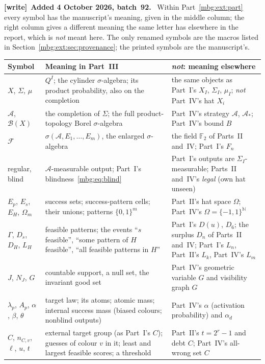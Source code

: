 \documentclass[11pt,letterpaper]{article}
\theoremstyle{definition}
\newcommand{\N}{\mathbb N}
\newcommand{\Sig}{\Sigma}
\newcommand{\F}{\mathbb F}
\newcommand{\Fext}{\mathcal F}
\newcommand{\A}{\mathcal A}
\newcommand{\B}{\mathcal B}
\newcommand{\cyl}{\Sigma}
\newenvironment{writenote}[1][]{\par\smallskip\begingroup\small
 \noindent\textbf{[write]}\if\relax\detokenize{#1}\relax\else~\textbf{#1.}\fi\ }%
 {\par\endgroup\smallskip}
\begin{document}
\begin{writenote}[Added 4 October 2026, batch~92]
Within Part~\ref{mbg:ext:part} every symbol has the manuscript's meaning, given in the middle column; the right column gives a different meaning the same letter has elsewhere in the report, which is \emph{not} meant here. The only renamed symbols are the macros listed in Section~\ref{mbg:ext:sec:provenance}; the printed symbols are the manuscript's.
\begin{longtable}{>{\raggedright\arraybackslash}p{}>{\raggedright\arraybackslash}p{}>{\raggedright\arraybackslash}p{}}
\toprule
Symbol & Meaning in Part~III & \emph{not}: meaning elsewhere\\
\midrule
\endhead
$X$, $\cyl$, $\mu$ & $Q^I$; the cylinder $\sigma$-algebra; its product probability, also on the completion & the same objects as Part~I's $X_I$, $\Sig_I$, $\mu_I$; \emph{not} Part~IV's hat $X_i$\\
$\A$, $\B(X)$ & the completion of $\cyl$; the full product-topology Borel $\sigma$-algebra & Part~IV's strategy $\mathcal A$, $\mathcal A_*$; Part~IV's bound $B$\\
$\Fext$ & $\sigma(\A,E_1,\ldots,E_m)$, the enlarged $\sigma$-algebra & the field $\F_2$ of Parts~II and~IV; Part~I's $F_n$\\
regular, blind & $\A$-measurable output; Part~I's blindness~\eqref{mbg:eq:blind} & Part~I's outputs are $\Sig_I$-measurable; Parts~II and~IV's \emph{legal} (own hat unseen)\\
$E_p$, $E_s$, $E_H$, $\Omega_m$ & success sets; success-pattern cells; their unions; patterns $\{0,1\}^m$ & Part~II's hat space $\Omega$; Part~IV's $\Omega=\{-1,1\}^\N$\\
$\Gamma$, $D_s$, $D_H$, $L_H$ & feasible patterns; the events ``$s$ feasible'', ``some pattern of $H$ feasible'', ``all feasible patterns in $H$'' & Part~I's $D(u)$, $D_6$; the surplus $D_n$ of Parts~II and~IV; Part~I's $L_n$, Part~II's $L_k$, Part~IV's $L_m$\\
$J$, $N_J$, $G$ & countable support, a null set, the invariant good set & Part~IV's geometric variable $G$ and visibility graph $G$\\
$\lambda_p$, $A_p$, $\alpha$, $\beta$, $\theta$ & target law; its atoms; atomic mass; internal success mass (biased colours; nonblind outputs) & Part~IV's $\alpha$ (activation probability) and $\alpha_d$\\
$C$, $n_{C,v}$, $\ell$, $u$, $t$ & external target group (as Part~I's $C$); guesses of colour $v$ in it; least and largest feasible scores; a threshold & Part~II's $t=2^r-1$ and debt $C$; Part~IV's all-wrong set $C$\\

\end{longtable}
\end{writenote}
\end{document}
